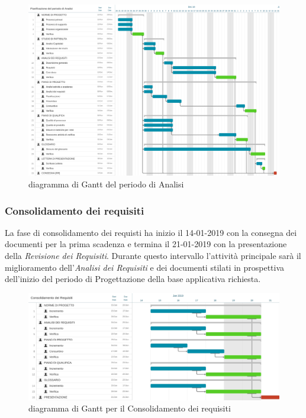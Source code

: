 \begin{figure}[htbp]
	\centering
	\includegraphics[width=15cm,keepaspectratio]{../includes/pics/grafici/Gantt_analisi.jpeg}
	\caption{\label{fig:gantt-analisi}diagramma di Gantt del periodo di Analisi}
\end{figure}

\clearpage
\subsubsection{Consolidamento dei requisiti}
La fase di consolidamento dei requisti ha inizio il 14-01-2019 con la consegna dei documenti per la prima scadenza e termina il 21-01-2019 con la presentazione della \emph{Revisione dei Requisiti}. Durante questo intervallo l'attività principale sarà il miglioramento dell'\emph{Analisi dei Requisiti} e dei documenti stilati in prospettiva dell'inizio del periodo di Progettazione della base applicativa richiesta.\\
\begin{figure}[htbp]
	\centering
	\includegraphics[width=15cm,keepaspectratio]{../includes/pics/grafici/Gantt_consolidamento_requisiti.jpeg}
	\caption{\label{fig:gantt-consolidamento}diagramma di Gantt per il Consolidamento dei requisiti}
\end{figure}

